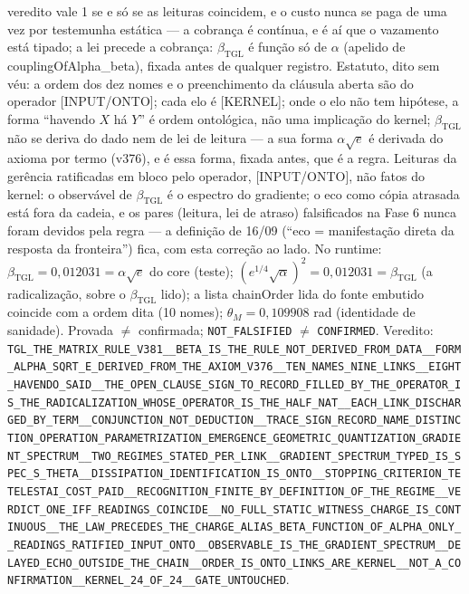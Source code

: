 \documentclass[11pt]{article}
\newcommand{\bTGL}{\beta_{\mathrm{TGL}}}\newcommand{\Msun}{M_{\odot}}\newcommand{\TGL}{\mathrm{TGL}}
\theoremstyle{definition}\newtheorem{deriv}{Derivação}
\begin{document}
veredito vale 1 se e só se as leituras coincidem, e o custo nunca se paga de uma vez por testemunha estática --- a cobrança é contínua, e é aí que o vazamento está tipado; a lei precede a cobrança: $\bTGL$ é função só de $\alpha$ (apelido de \textsf{couplingOfAlpha\_beta}), fixada antes de qualquer registro. Estatuto, dito sem véu: a ordem dos dez nomes e o preenchimento da cláusula aberta são do operador \textsf{[INPUT/ONTO]}; cada elo é \textsf{[KERNEL]}; onde o elo não tem hipótese, a forma ``havendo $X$ há $Y$'' é ordem ontológica, não uma implicação do kernel; $\bTGL$ não se deriva do dado nem de lei de leitura --- a sua forma $\alpha\sqrt e$ é derivada do axioma por termo (v376), e é essa forma, fixada antes, que é a regra. Leituras da gerência ratificadas em bloco pelo operador, \textsf{[INPUT/ONTO]}, não fatos do kernel: o observável de $\bTGL$ é o espectro do gradiente; o eco como cópia atrasada está fora da cadeia, e os pares (leitura, lei de atraso) falsificados na Fase 6 nunca foram devidos pela regra --- a definição de 16/09 (``eco = manifestação direta da resposta da fronteira'') fica, com esta correção ao lado. No runtime: $\bTGL=0{,}012031=\alpha\sqrt e$ do core (teste); $(e^{1/4}\sqrt\alpha)^2=0{,}012031=\bTGL$ (a radicalização, sobre o $\bTGL$ lido); a lista \textsf{chainOrder} lida do fonte embutido coincide com a ordem dita (10 nomes); $\theta_M=0{,}109908$ rad (identidade de sanidade). Provada $\neq$ confirmada; \texttt{NOT\_FALSIFIED} $\neq$ \texttt{CONFIRMED}. Veredito: \texttt{TGL\_THE\_MATRIX\_RULE\_V381\_\_BETA\_IS\_THE\_RULE\_NOT\_DERIVED\_FROM\_DATA\_\_FORM\_ALPHA\_SQRT\_E\_DERIVED\_FROM\_THE\_AXIOM\_V376\_\_TEN\_NAMES\_NINE\_LINKS\_\_EIGHT\_HAVENDO\_SAID\_\_THE\_OPEN\_CLAUSE\_SIGN\_TO\_RECORD\_FILLED\_BY\_THE\_OPERATOR\_IS\_THE\_RADICALIZATION\_WHOSE\_OPERATOR\_IS\_THE\_HALF\_NAT\_\_EACH\_LINK\_DISCHARGED\_BY\_TERM\_\_CONJUNCTION\_NOT\_DEDUCTION\_\_TRACE\_SIGN\_RECORD\_NAME\_DISTINCTION\_OPERATION\_PARAMETRIZATION\_EMERGENCE\_GEOMETRIC\_QUANTIZATION\_GRADIENT\_SPECTRUM\_\_TWO\_REGIMES\_STATED\_PER\_LINK\_\_GRADIENT\_SPECTRUM\_TYPED\_IS\_SPEC\_S\_THETA\_\_DISSIPATION\_IDENTIFICATION\_IS\_ONTO\_\_STOPPING\_CRITERION\_TETELESTAI\_COST\_PAID\_\_RECOGNITION\_FINITE\_BY\_DEFINITION\_OF\_THE\_REGIME\_\_VERDICT\_ONE\_IFF\_READINGS\_COINCIDE\_\_NO\_FULL\_STATIC\_WITNESS\_CHARGE\_IS\_CONTINUOUS\_\_THE\_LAW\_PRECEDES\_THE\_CHARGE\_ALIAS\_BETA\_FUNCTION\_OF\_ALPHA\_ONLY\_\_READINGS\_RATIFIED\_INPUT\_ONTO\_\_OBSERVABLE\_IS\_THE\_GRADIENT\_SPECTRUM\_\_DELAYED\_ECHO\_OUTSIDE\_THE\_CHAIN\_\_ORDER\_IS\_ONTO\_LINKS\_ARE\_KERNEL\_\_NOT\_A\_CONFIRMATION\_\_KERNEL\_24\_OF\_24\_\_GATE\_UNTOUCHED}.
\end{document}
